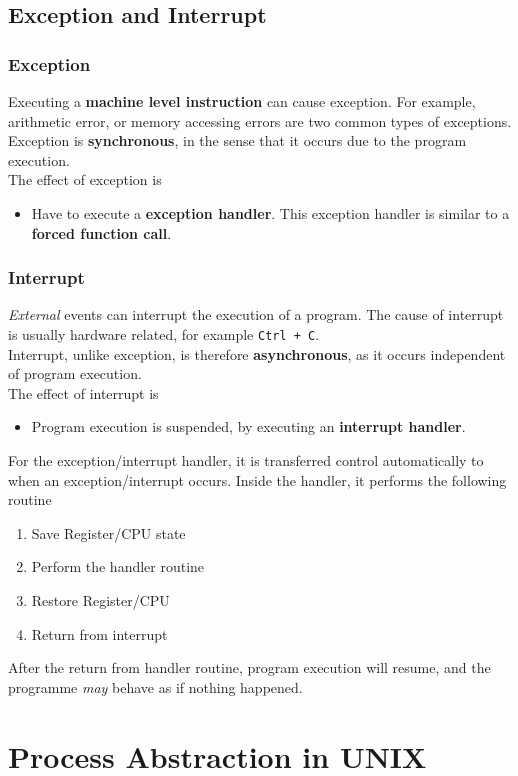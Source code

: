 \documentclass[11pt]{article}
\theoremstyle{definition}
\begin{document}
\subsection{Exception and Interrupt}
\subsubsection{Exception}
Executing a \textbf{machine level instruction} can cause exception. For example, arithmetic error, or memory accessing errors are two common types of exceptions.\\
Exception is \textbf{synchronous}, in the sense that it occurs due to the program execution.\\
The effect of exception is 
\begin{itemize}[itemsep=0pt]
  \item Have to execute a \textbf{exception handler}. This exception handler is similar to a \textbf{forced function call}.
\end{itemize}
\subsubsection{Interrupt}
\textit{External} events can interrupt the execution of a program. The cause of interrupt is usually hardware related, for example \texttt{Ctrl + C}.\\
Interrupt, unlike exception, is therefore \textbf{asynchronous}, as it occurs independent of program execution.\\
The effect of interrupt is
\begin{itemize}[itemsep=0pt]
  \item Program execution is suspended, by executing an \textbf{interrupt handler}.
\end{itemize}
For the exception/interrupt handler, it is transferred control automatically to when an exception/interrupt occurs. Inside the handler, it performs the following routine
\begin{enumerate}
  \item Save Register/CPU state
  \item Perform the handler routine
  \item Restore Register/CPU
  \item Return from interrupt
\end{enumerate}
After the return from handler routine, program execution will resume, and the programme \textit{may} behave as if nothing happened.
\section{Process Abstraction in UNIX}
\end{document}
